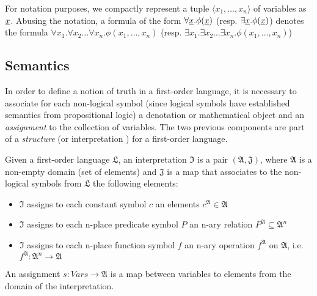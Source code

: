 \begin{definition}
For notation purposes, we compactly represent a tuple $\langle x_1, \dots, x_n \rangle$ of variables as
$\underline{x}$. Abusing the notation, a formula of the form 
$\forall \underline{x} . \phi(\underline{x})$ (resp. $\exists \underline{x} . \phi(\underline{x})$)
denotes the formula $\forall x_1 . \forall x_2 \dots \forall x_n . \phi(x_1, \dots, x_n)$
(resp. $\exists x_1 . \exists x_2 \dots \exists x_n . \phi(x_1, \dots, x_n)$)

\end{definition}

\subsection{Semantics}

In order to define a notion of truth in a first-order language, it is necessary to 
associate for each non-logical symbol (since logical symbols have established 
semantics from propositional logic) a denotation or mathematical object and 
an \emph{assignment} to the collection of variables. The two previous 
components are part of a \emph{structure} \cite{DBLP:books/daglib/0076838} 
(or interpretation \cite{DBLP:books/daglib/0080654}) for a first-order language.

\begin{definition}
  Given a first-order language $\mathfrak{L}$, an interpretation $\mathfrak{I}$ is a pair $(\mathfrak{A}, \mathfrak{J})$, where $\mathfrak{A}$ is a non-empty domain (set of elements) and $\mathfrak{J}$ is a map that associates to the non-logical symbols from $\mathfrak{L}$ the following elements:
  \begin{itemize}
    \item $\mathfrak{I}$ assigns to each constant symbol $c$
      an elements $c^\mathfrak{A} \in \mathfrak{A}$
    \item $\mathfrak{I}$ assigns to each n-place
      predicate symbol $P$ an n-ary relation 
      $P^{\mathfrak{A}} \subseteq \mathfrak{A}^n$
    \item $\mathfrak{I}$ assigns to each n-place function
      symbol $f$ an n-ary operation $f^\mathfrak{A}$
      on $\mathfrak{A}$, i.e. $f^\mathfrak{A} : 
      \mathfrak{A}^n \rightarrow \mathfrak{A}$
  \end{itemize}

  An assignment $s : Vars \rightarrow \mathfrak{A}$ is a 
  map between variables to elements from the domain of 
  the interpretation.
\end{definition}

